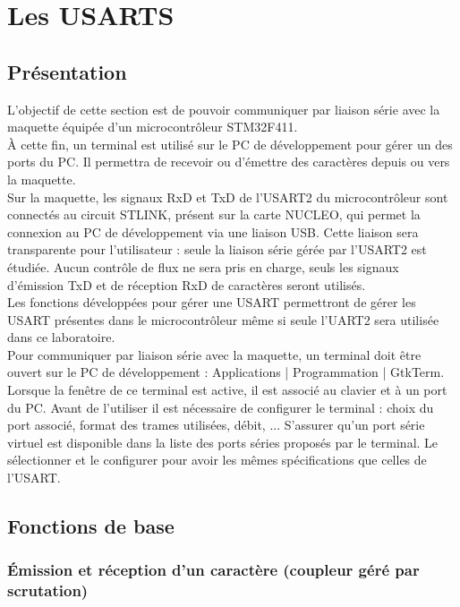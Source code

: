 \part{Les USARTS}
\chapter{Présentation}

L'objectif de cette section est de pouvoir communiquer par liaison série avec la maquette équipée d'un microcontrôleur STM32F411.\\
À cette fin, un terminal est utilisé sur le PC de développement pour gérer un des ports du PC. Il permettra de recevoir ou d'émettre des caractères depuis ou vers la maquette.\\

Sur la maquette, les signaux RxD et TxD de l'USART2 du microcontrôleur sont connectés au circuit STLINK, présent sur la carte NUCLEO, qui permet la connexion au PC de développement via une liaison USB. Cette liaison sera transparente pour l'utilisateur : seule la liaison série gérée par l'USART2 est étudiée. Aucun contrôle de flux ne sera pris en charge, seuls les signaux d'émission TxD et de réception RxD de caractères seront utilisés. \\

Les fonctions développées pour gérer une USART permettront de gérer les USART présentes dans
le microcontrôleur même si seule l'UART2 sera utilisée dans ce laboratoire. \\

Pour communiquer par liaison série avec la maquette, un terminal doit être ouvert sur le PC
de développement : Applications | Programmation | GtkTerm. \\
Lorsque la fenêtre de ce terminal est active, il est associé au clavier et à un port du PC. Avant de l'utiliser il est nécessaire de configurer le terminal : choix du port associé, format des trames utilisées, débit, ... S'assurer qu'un port série virtuel est disponible dans la liste des ports séries proposés par le terminal. Le sélectionner et le configurer pour avoir les mêmes spécifications que celles de l'USART.\\

\chapter{Fonctions de base}

\section{Émission et réception d'un caractère (coupleur géré par scrutation)}

